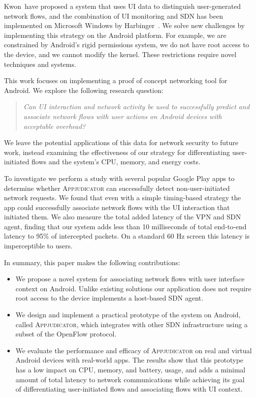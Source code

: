 Kwon~\etal have proposed a system that uses UI data to distinguish
user-generated network flows, and the combination of UI monitoring and SDN has
been implemented on Microsoft Windows by Harbinger~\cite{chuluundorj2019}.  We
solve new challenges by implementing this strategy on the Android platform. For
example, we are constrained by Android's rigid permissions system, we do not
have root access to the device, and we cannot modify the kernel. These
restrictions require novel techniques and systems.

This work focuses on implementing a proof of concept networking tool for
Android. We explore the following research question:
\begin{quote}
	\textit{Can UI interaction and network activity be used to successfully
		predict and associate network flows with user actions on Android devices
		with acceptable overhead?}
\end{quote}
We leave the potential applications of this data for network security to future
work, instead examining the effectiveness of our strategy for differentiating
user-initiated flows and the system's CPU, memory, and energy costs.

To investigate we perform a study with several popular Google Play apps to
determine whether \textsc{Appjudicator} can successfully detect
non-user-initiated network requests. We found that even with a simple
timing-based strategy the app could successfully associate network flows with
the UI interaction that initiated them. We also measure the total added latency
of the VPN and SDN agent, finding that our system adds less than 10 milliseconds
of total end-to-end latency to 95\% of intercepted packets. On a standard 60 Hz
screen this latency is imperceptible to users.

In summary, this paper makes the following contributions:

\begin{itemize}
	\item We propose a novel system for associating network flows with user
		interface context on Android. Unlike existing solutions our application
		does not require root access to the device implements a host-based SDN
		agent.
	\item We design and implement a practical prototype of the system on
		Android, called \textsc{Appjudicator}, which integrates with other SDN
		infrastructure using a subset of the OpenFlow protocol.
	\item We evaluate the performance and efficacy of \textsc{Appjudicator} on
		real and virtual Android devices with real-world apps. The results show
		that this prototype has a low impact on CPU, memory, and battery, usage,
		and adds a minimal amount of total latency to network communications
		while achieving its goal of differentiating user-initiated flows and
		associating flows with UI context.
\end{itemize}

\newpage
